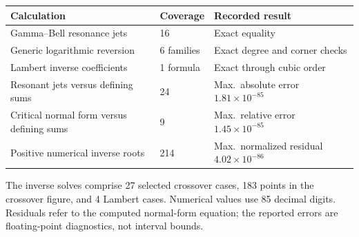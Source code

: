 \begin{center}
\small
\begin{tabular}{@{}p{}p{}p{}@{}}
\toprule
Calculation & Coverage & Recorded result\\
\midrule
Gamma--Bell resonance jets & 16 & Exact equality\\[3pt]
Generic logarithmic reversion & 6 families & Exact degree and corner checks\\[3pt]
Lambert inverse coefficients & 1 formula & Exact through cubic order\\[3pt]
Resonant jets versus defining sums & 24 & Max.\ absolute error $1.81\times10^{-85}$\\[3pt]
Critical normal form versus defining sums & 9 & Max.\ relative error $1.45\times10^{-85}$\\[3pt]
Positive numerical inverse roots & 214 & Max.\ normalized residual $4.02\times10^{-86}$\\[3pt]
\bottomrule
\end{tabular}
\end{center}
{\footnotesize The inverse solves comprise 27 selected crossover cases, 183 points in the crossover figure, and 4 Lambert cases. Numerical values use 85 decimal digits. Residuals refer to the computed normal-form equation; the reported errors are floating-point diagnostics, not interval bounds.\par}
